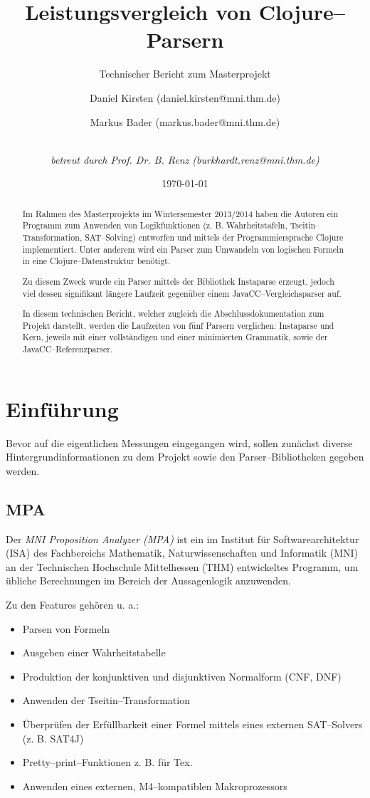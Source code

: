\documentclass[ngerman,a4paper,abstracton,open=right,twoside=false,toc=listofnumbered,bibtotocnumbered]{scrreprt}
\title{Leistungsvergleich von Clojure--Parsern}
\subtitle{Technischer Bericht zum Masterprojekt}
\author{Daniel Kirsten (daniel.kirsten@mni.thm.de)
\and
Markus Bader (markus.bader@mni.thm.de)
\and\\
\emph{betreut durch Prof. Dr. B. Renz (burkhardt.renz@mni.thm.de)}
}
\date{\today}
\begin{document}
\maketitle
\newpage
\begin{abstract}

Im Rahmen des Masterprojekts im Wintersemester 2013/2014 haben die Autoren ein Programm zum Anwenden von Logikfunktionen (z. B. Wahrheitstafeln, Tseitin--Transformation, SAT--Solving) entworfen und mittels der Programmiersprache Clojure implementiert. Unter anderem wird ein Parser zum Umwandeln von logischen Formeln in eine Clojure--Datenstruktur benötigt.

Zu diesem Zweck wurde ein Parser mittels der Bibliothek Instaparse erzeugt, jedoch viel dessen signifikant längere Laufzeit gegenüber einem JavaCC--Vergleichsparser auf.

In diesem technischen Bericht, welcher zugleich die Abschlussdokumentation zum Projekt darstellt, werden die Laufzeiten von fünf Parsern verglichen: Instaparse und Kern, jeweils mit einer vollständigen und einer minimierten Grammatik, sowie der JavaCC--Referenzparser.

\end{abstract}
\newpage
\tableofcontents
\newpage

\chapter{Einführung}

Bevor auf die eigentlichen Messungen eingegangen wird, sollen zunächst diverse Hintergrundinformationen zu dem Projekt sowie den Parser--Bibliotheken gegeben werden.

\section{MPA}

Der \emph{MNI Proposition Analyzer (MPA)} ist ein im Institut für Softwarearchitektur (ISA) des Fachbereichs Mathematik, Naturwissenschaften und Informatik (MNI) an der Technischen Hochschule Mittelhessen (THM) entwickeltes Programm, um übliche Berechnungen im Bereich der Aussagenlogik anzuwenden. \cite{mpa}

Zu den Features gehören u. a.:

\begin{itemize}
	\item Parsen von Formeln
	\item Ausgeben einer Wahrheitstabelle
	\item Produktion der konjunktiven und disjunktiven Normalform (CNF, DNF)
	\item Anwenden der Tseitin--Transformation
	\item Überprüfen der Erfüllbarkeit einer Formel mittels eines externen SAT--Solvers (z. B. SAT4J)
	\item Pretty--print--Funktionen z. B. für Tex.
	\item Anwenden eines externen, M4--kompatiblen Makroprozessors
\end{itemize}
\end{document}
